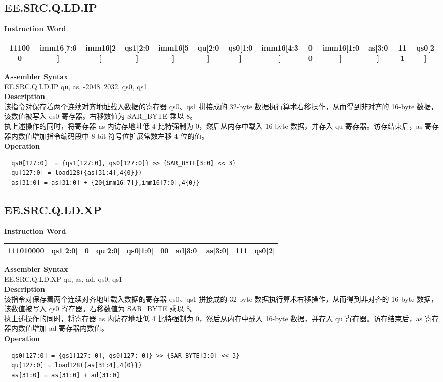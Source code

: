 \clearpage
\subsection{EE.SRC.Q.LD.IP}\label{instruction:EESRCQLDIP}
\setlength\tabcolsep{3.5pt}
\textbf{Instruction Word} \\
\begin{tabular}{|c|c|c|c|c|c|c|c|c|c|c|c|c|}
	\hline
	111000 & imm16[7:6] & imm16[2] & qs1[2:0] & imm16[5] & qu[2:0] & qs0[1:0] & imm16[4:3] & 00 & imm16[1:0] & as[3:0] & 111 & qs0[2] \\
	\hline
\end{tabular}

\textbf{Assembler Syntax} \\
EE.SRC.Q.LD.IP qu, as, -2048..2032, qs0, qs1 \\
\textbf{Description} \\
该指令对保存着两个连续对齐地址载入数据的寄存器 qs0、qs1 拼接成的 32-byte 数据执行算术右移操作，从而得到非对齐的 16-byte 数据，该数值被写入 qs0 寄存器。右移数值为 SAR\_BYTE 乘以 8。\\
执上述操作的同时，将寄存器 as 内访存地址低 4 比特强制为 0，然后从内存中载入 16-byte 数据，并存入 qu 寄存器。访存结束后，as 寄存器内数值增加指令编码段中 8-bit 符号位扩展常数左移 4 位的值。\\
\textbf{Operation}
\begin{lstlisting}
  qs0[127:0]  = {qs1[127:0], qs0[127:0]} >> {SAR_BYTE[3:0] << 3}
  qu[127:0] = load128({as[31:4],4{0}})
  as[31:0] = as[31:0] + {20{imm16[7]},imm16[7:0],4{0}}
\end{lstlisting}

\clearpage
\subsection{EE.SRC.Q.LD.XP}\label{instruction:EESRCQLDXP}
\setlength\tabcolsep{6pt}
\textbf{Instruction Word} \\
\begin{tabular}{|c|c|c|c|c|c|c|c|c|c|}
	\hline
	111010000 & qs1[2:0] & 0 & qu[2:0] & qs0[1:0] & 00 & ad[3:0] & as[3:0] & 111 & qs0[2] \\
	\hline
\end{tabular}

\textbf{Assembler Syntax} \\
EE.SRC.Q.LD.XP qu, as, ad, qs0, qs1 \\
\textbf{Description} \\
该指令对保存着两个连续对齐地址载入数据的寄存器 qs0、qs1 拼接成的 32-byte 数据执行算术右移操作，从而得到非对齐的 16-byte 数据，该数值被写入 qs0 寄存器。右移数值为 SAR\_BYTE 乘以 8。\\
执上述操作的同时，将寄存器 as 内访存地址低 4 比特强制为 0，然后从内存中载入 16-byte 数据，并存入 qu 寄存器。访存结束后，as 寄存器内数值增加 ad 寄存器内数值。\\
\textbf{Operation}
\begin{lstlisting}
  qs0[127:0] = {qs1[127: 0], qs0[127: 0]} >> {SAR_BYTE[3:0] << 3}
  qu[127:0] = load128({as[31:4],4{0}})
  as[31:0] = as[31:0] + ad[31:0]
\end{lstlisting}

